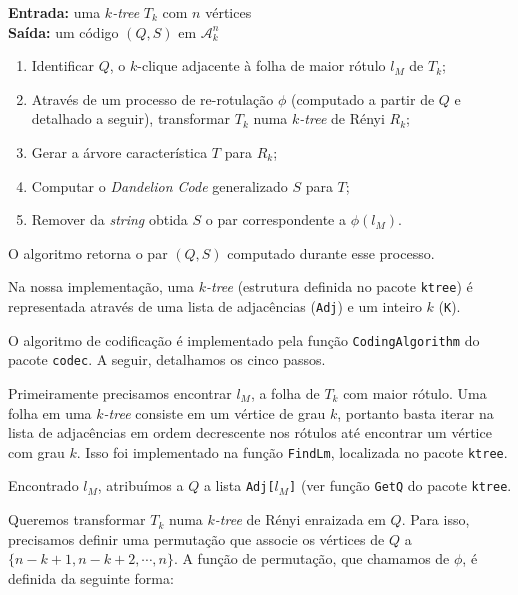 \begin{algorithm}
  \textbf{Entrada:} uma \emph{$k$-tree} $T_k$ com $n$ vértices\\
  \textbf{Saída:} um código $(Q, S)$ em $\mathcal{A}^n_k$

  \begin{enumerate}
    \item Identificar $Q$, o $k$-clique adjacente à folha de maior rótulo $l_M$ de $T_k$;
    \item Através de um processo de re-rotulação $\phi$ (computado a partir de $Q$ e detalhado a seguir), transformar $T_k$ numa \emph{$k$-tree} de Rényi $R_k$;
    \item Gerar a árvore característica $T$ para $R_k$;
    \item Computar o \emph{Dandelion Code} generalizado $S$ para $T$;
    \item Remover da \emph{string} obtida $S$ o par correspondente a $\phi(l_M)$.
  \end{enumerate}

  O algoritmo retorna o par $(Q, S)$ computado durante esse processo.

  \vspace{2em}

  Na nossa implementação, uma \emph{$k$-tree} (estrutura definida no pacote {\tt ktree}) é representada através de uma lista de adjacências ({\tt Adj}) e um inteiro $k$ ({\tt K}). %

  O algoritmo de codificação é implementado pela função {\tt CodingAlgorithm} do pacote {\tt codec}. A seguir, detalhamos os cinco passos.

  \begin{step}
    Primeiramente precisamos encontrar $l_M$, a folha de $T_k$ com maior rótulo. Uma folha em uma \emph{$k$-tree} consiste em um vértice de grau $k$, portanto basta iterar na lista de adjacências em ordem decrescente nos rótulos até encontrar um vértice com grau $k$. Isso foi implementado na função {\tt FindLm}, localizada no pacote {\tt ktree}.

    Encontrado $l_M$, atribuímos a $Q$ a lista {\tt Adj[$l_M$]} (ver função {\tt GetQ} do pacote {\tt ktree}.
  \end{step}

  \begin{step}
    Queremos transformar $T_k$ numa \emph{$k$-tree} de Rényi enraizada em $Q$. Para isso, precisamos definir uma permutação que associe os vértices de $Q$ a $\{n-k+1, n-k+2, \cdots, n\}$. A função de permutação, que chamamos de $\phi$, é definida da seguinte forma:


\end{step}
\end{algorithm}
